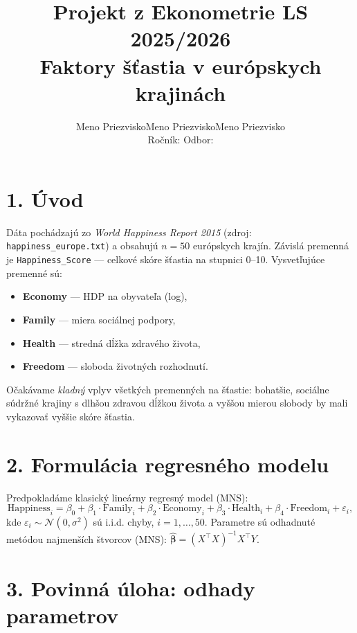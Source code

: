 \documentclass[12pt,a4paper]{article}
\title{\textbf{Projekt z Ekonometrie LS 2025/2026}\\
\large Faktory šťastia v európskych krajinách}
\author{Meno Priezvisko\quad Meno Priezvisko\quad Meno Priezvisko\\
\small Ročník: \quad Odbor: }
\date{}
\begin{document}
\maketitle

\section*{1. Úvod}

Dáta pochádzajú zo \textit{World Happiness Report 2015}
(zdroj: \texttt{happiness\_europe.txt}) a obsahujú $n = 50$
európskych krajín. Závislá premenná je \texttt{Happiness\_Score} ---
celkové skóre šťastia na stupnici 0--10. Vysvetľujúce premenné sú:

\begin{itemize}\itemsep0pt
  \item \textbf{Economy} --- HDP na obyvateľa (log),
  \item \textbf{Family} --- miera sociálnej podpory,
  \item \textbf{Health} --- stredná dĺžka zdravého života,
  \item \textbf{Freedom} --- sloboda životných rozhodnutí.
\end{itemize}

Očakávame \textit{kladný} vplyv všetkých premenných na šťastie:
bohatšie, sociálne súdržné krajiny s dlhšou zdravou dĺžkou života
a vyššou mierou slobody by mali vykazovať vyššie skóre šťastia.

\section*{2. Formulácia regresného modelu}

Predpokladáme klasický lineárny regresný model (MNS):
\[
  \text{Happiness}_i = \beta_0 + \beta_1 \cdot \text{Family}_i
  + \beta_2 \cdot \text{Economy}_i
  + \beta_3 \cdot \text{Health}_i
  + \beta_4 \cdot \text{Freedom}_i + \varepsilon_i,
\]
kde $\varepsilon_i \sim \mathcal{N}(0,\sigma^2)$ sú i.i.d. chyby,
$i = 1,\ldots,50$. Parametre sú odhadnuté metódou najmenších štvorcov
(MNS): $\hat{\boldsymbol{\beta}} = (X^\top X)^{-1} X^\top Y$.

\section*{3. Povinná úloha: odhady parametrov}
\end{document}
